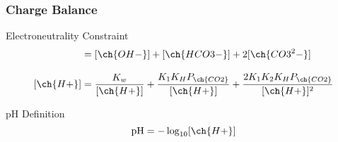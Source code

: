 \frametitle{Charge Balance}

\begin{block}{Electroneutrality Constraint}
\begin{align*}
[\ch{H+}] &= [\ch{OH-}] + [\ch{HCO3-}] + 2[\ch{CO3^2-}] \\[0.3cm]
[\ch{H+}] &= \frac{K_w}{[\ch{H+}]} + \frac{K_1 K_H P_{\ch{CO2}}}{[\ch{H+}]} + \frac{2 K_1 K_2 K_H P_{\ch{CO2}}}{[\ch{H+}]^2}
\end{align*}
\end{block}

\begin{block}{pH Definition}
\begin{equation*}
\text{pH} = -\log_{10}[\ch{H+}]
\end{equation*}
\end{block}